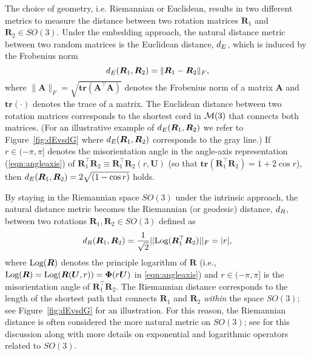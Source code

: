 The choice of geometry, i.e.\!\! Riemannian or Euclidean, results in two different metrics to measure the distance
between two rotation matrices $\bm{R}_1$ and $\bm{R}_2 \in SO(3)$. Under the embedding approach, the natural distance
metric between two random matrices is the Euclidean distance, ${d_E} $, which is induced by the Frobenius norm
\begin{equation}
\label{d_E}
{d_E} (\bm{R}_1,\bm{R}_2)=\|\bm{R}_1-\bm{R}_2\|_F, 
\end{equation}
where $\|\bm{A}\|_F = \sqrt{\mathbf{tr}({\bm A^\top \bm A})}$ denotes the Frobenius norm of a matrix $\bm A$ and $\mathbf{tr}(\cdot)$ denotes the trace of a matrix.  The Euclidean distance between two rotation matrices corresponds to the shortest cord in $\mathcal{M}(3)$  that connects both matrices. (For an illustrative example of ${d_E} (\bm{R}_1,\bm{R}_2)$ we refer to Figure~\ref{fig:dEvsdG} where ${d_E} (\bm{R}_1,\bm{R}_2)$ corresponds to the gray line.)  If $r\in(-\pi,\pi]$ denotes the misorientation angle in the angle-axis representation (\ref{eqn:angleaxis}) of $\bm{R}_1^\top \bm{R}_2 \equiv \bm{R}_1^\top \bm{R}_2(r,\bm{U})$ (so that $\mathbf{tr}(\bm{R}_1^\top \bm{R}_2) =1 +2 \cos r$), then ${d_E} (\bm{R}_1,\bm{R}_2) = 2\sqrt{(1-\cos r)}$ holds.

\noindent By staying in the Riemannian space $SO(3)$ under the intrinsic approach, the natural distance metric becomes the Riemannian (or geodesic) distance, ${d_R} $, between two rotations $\bm{R}_1,\bm{R}_2\in SO(3)$ defined as
\begin{equation}
\label{d_R}
{d_R} (\bm{R}_1,\bm{R}_2)=  \frac{1}{\sqrt{2}}||
\text{Log}(\bm{R}_1^\top\bm{R}_2)||_F = |r|,
\end{equation}
where $\text{Log}(\bm{R})$ denotes the principle logarithm of $\bm{R}$ (i.e., $\text{Log}(\bm{R}) = \text{Log}(\bm{R}(\bm U,r))= \bm \Phi(r\bm U)$ in \eqref{eqn:angleaxis}) and $r\in(-\pi,\pi]$   is the misorientation angle of $\bm{R}_1^\top \bm{R}_2$.  The Riemannian distance corresponds to the length of the shortest path that connects $\bm{R}_1$ and $\bm{R}_2$ {\it within} the space $SO(3)$; see Figure~\ref{fig:dEvsdG} for an illustration. For this reason, the Riemannian distance is often considered the more natural metric on $SO(3)$; see \cite{moakher02} for this discussion along with more details on exponential and logarithmic operators related to $SO(3)$.    
 

